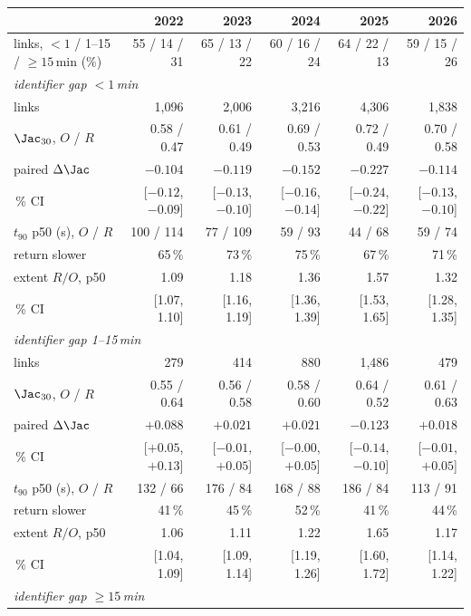 \begin{tabular}{lrrrrr}
\toprule
 & 2022 & 2023 & 2024 & 2025 & 2026 \\
\midrule
links, $<1$ / 1--15 / $\geq 15$\,min (\%) & 55 / 14 / 31 & 65 / 13 / 22 & 60 / 16 / 24 & 64 / 22 / 13 & 59 / 15 / 26 \\
\midrule
\multicolumn{6}{l}{\emph{identifier gap $<1$\,min}} \\
links & 1,096 & 2,006 & 3,216 & 4,306 & 1,838 \\
$\Jac_{30}$, $O$ / $R$ & 0.58 / 0.47 & 0.61 / 0.49 & 0.69 / 0.53 & 0.72 / 0.49 & 0.70 / 0.58 \\
paired $\Delta\Jac$ & $-0.104$ & $-0.119$ & $-0.152$ & $-0.227$ & $-0.114$ \\
\quad 95\,\% CI & [$-0.12$, $-0.09$] & [$-0.13$, $-0.10$] & [$-0.16$, $-0.14$] & [$-0.24$, $-0.22$] & [$-0.13$, $-0.10$] \\
$t_{90}$ p50 (s), $O$ / $R$ & 100 / 114 & 77 / 109 & 59 / 93 & 44 / 68 & 59 / 74 \\
return slower & 65\,\% & 73\,\% & 75\,\% & 67\,\% & 71\,\% \\
extent $R/O$, p50 & 1.09 & 1.18 & 1.36 & 1.57 & 1.32 \\
\quad 95\,\% CI & [1.07, 1.10] & [1.16, 1.19] & [1.36, 1.39] & [1.53, 1.65] & [1.28, 1.35] \\
\midrule
\multicolumn{6}{l}{\emph{identifier gap 1--15\,min}} \\
links & 279 & 414 & 880 & 1,486 & 479 \\
$\Jac_{30}$, $O$ / $R$ & 0.55 / 0.64 & 0.56 / 0.58 & 0.58 / 0.60 & 0.64 / 0.52 & 0.61 / 0.63 \\
paired $\Delta\Jac$ & $+0.088$ & $+0.021$ & $+0.021$ & $-0.123$ & $+0.018$ \\
\quad 95\,\% CI & [$+0.05$, $+0.13$] & [$-0.01$, $+0.05$] & [$-0.00$, $+0.05$] & [$-0.14$, $-0.10$] & [$-0.01$, $+0.05$] \\
$t_{90}$ p50 (s), $O$ / $R$ & 132 / 66 & 176 / 84 & 168 / 88 & 186 / 84 & 113 / 91 \\
return slower & 41\,\% & 45\,\% & 52\,\% & 41\,\% & 44\,\% \\
extent $R/O$, p50 & 1.06 & 1.11 & 1.22 & 1.65 & 1.17 \\
\quad 95\,\% CI & [1.04, 1.09] & [1.09, 1.14] & [1.19, 1.26] & [1.60, 1.72] & [1.14, 1.22] \\
\midrule
\multicolumn{6}{l}{\emph{identifier gap $\geq 15$\,min}} \\

\end{tabular}
